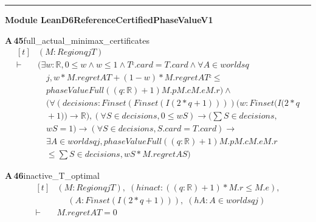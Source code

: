 \documentclass[conference]{IEEEtran}
\theoremstyle{definition}
\newcommand{\lean}[1]{\textsf{\footnotesize #1}}
\begin{document}
\vspace{4pt}\noindent\rule{\columnwidth}{0.4pt}\par\vspace{2pt}
\noindent\textbf{Module \lean{LeanD6ReferenceCertifiedPhaseValueV1}}\par\vspace{3pt}

\noindent\textbf{A\,45}\quad\lean{full\_actual\_minimax\_certificates}
{\footnotesize\[ \begin{aligned}[t]
&(\mathit{M} : \mathit{Region} \mathit{q} \mathit{j} \mathit{T})\\
\vdash\;&(\exists \mathit{w} : \mathbb{R} ,0 \leq \mathit{w} \wedge \mathit{w} \leq 1 \wedge \mathit{Tᶜ}.\mathit{card}=\mathit{T}.\mathit{card} \wedge \forall \mathit{A} \in \mathit{worlds} \mathit{q}\\
&\quad \mathit{j},\mathit{w}*\mathit{M}.\mathit{regret} \mathit{A} \mathit{T}+(1-\mathit{w})*\mathit{M}.\mathit{regret} \mathit{A} \mathit{Tᶜ} \leq\\
&\quad \mathit{phaseValueFull} ((\mathit{q}:\mathbb{R} )+1) \mathit{M}.\mathit{p} \mathit{M}.\mathit{c} \mathit{M}.\mathit{e} \mathit{M}.\mathit{r}) \wedge\\
&\quad (\forall (\mathit{decisions} : \mathit{Finset} (\mathit{Finset} (\mathit{I} (2*\mathit{q}+1)))) (\mathit{w} : \mathit{Finset} (\mathit{I} (2*\mathit{q}\\
&\quad +1)) \to \mathbb{R} ), (\forall \mathit{S} \in \mathit{decisions},0 \leq \mathit{w} \mathit{S}) \to (\textstyle\sum \mathit{S} \in \mathit{decisions},\\
&\quad \mathit{w} \mathit{S}=1) \to (\forall \mathit{S} \in \mathit{decisions},\mathit{S}.\mathit{card}=\mathit{T}.\mathit{card}) \to\\
&\quad \exists \mathit{A} \in \mathit{worlds} \mathit{q} \mathit{j},\mathit{phaseValueFull} ((\mathit{q}:\mathbb{R} )+1) \mathit{M}.\mathit{p} \mathit{M}.\mathit{c} \mathit{M}.\mathit{e} \mathit{M}.\mathit{r}\\
&\quad \leq \textstyle\sum \mathit{S} \in \mathit{decisions},\mathit{w} \mathit{S}*\mathit{M}.\mathit{regret} \mathit{A} \mathit{S})
\end{aligned} \]}

\noindent\textbf{A\,46}\quad\lean{inactive\_T\_optimal}
{\footnotesize\[ \begin{aligned}[t]
&(\mathit{M} : \mathit{Region} \mathit{q} \mathit{j} \mathit{T}),\; (\mathit{hinact} : ((\mathit{q}:\mathbb{R} )+1)*\mathit{M}.\mathit{r} \leq \mathit{M}.\mathit{e}),\\
&\quad \; (\mathit{A} : \mathit{Finset} (\mathit{I} (2*\mathit{q}+1))),\; (\mathit{hA} : \mathit{A} \in \mathit{worlds} \mathit{q} \mathit{j})\\
\vdash\;&\mathit{M}.\mathit{regret} \mathit{A} \mathit{T}=0
\end{aligned} \]}
\end{document}
